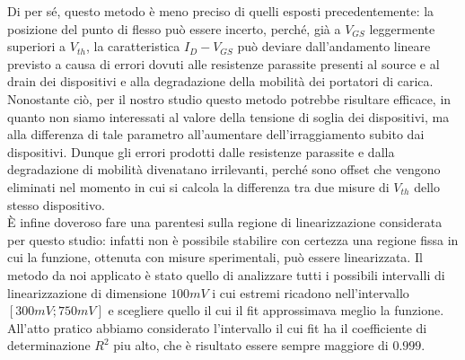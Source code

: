 \documentclass[
	a4paper,
	cleardoublepage=empty,
	headings=twolinechapter,
	numbers=autoenddot,
]{scrbook}
\begin{document}
Di per sé, questo metodo è meno preciso di quelli esposti precedentemente: la posizione del punto di flesso può essere incerto, perché, già a $V_{GS}$ leggermente superiori a $V_{th}$, la caratteristica $I_D-V_{GS}$ può deviare dall'andamento lineare previsto a causa di errori dovuti alle resistenze parassite presenti al source e al drain dei dispositivi e alla degradazione della mobilità dei portatori di carica.
Nonostante ciò, per il nostro studio questo metodo potrebbe risultare efficace, in quanto non siamo interessati al valore della tensione di soglia dei dispositivi, ma alla differenza di tale parametro all'aumentare dell'irraggiamento subito dai dispositivi. Dunque gli errori prodotti dalle resistenze parassite e dalla degradazione di mobilità divenatano irrilevanti, perché sono offset che vengono eliminati nel momento in cui si calcola la differenza tra due misure di $V_{th}$ dello stesso dispositivo.\\
È infine doveroso fare una parentesi sulla regione di linearizzazione considerata per questo studio: infatti non è possibile stabilire con certezza una regione fissa in cui la funzione, ottenuta con misure sperimentali, può essere linearizzata. Il metodo da noi applicato è stato quello di analizzare tutti i possibili intervalli di linearizzazione di dimensione $100 mV$ i cui estremi ricadono nell'intervallo $[300 mV ; 750mV]$ e scegliere quello il cui il fit approssimava meglio la funzione. All'atto pratico abbiamo considerato l'intervallo il cui fit ha il coefficiente di determinazione $R^2$ piu alto, che è risultato essere sempre maggiore di $0.999$.
\end{document}
